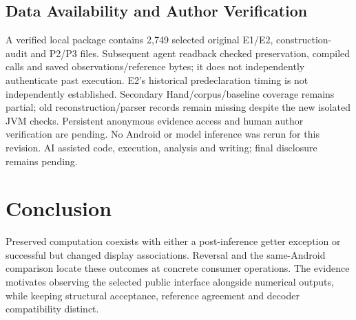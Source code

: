 \documentclass[10pt,conference]{IEEEtran}
\begin{document}
\subsection{Data Availability and Author Verification}
A verified local package contains 2,749 selected original E1/E2, construction-audit and P2/P3 files. Subsequent agent readback checked preservation, compiled calls and saved observations/reference bytes; it does not independently authenticate past execution. E2's historical predeclaration timing is not independently established. Secondary Hand/corpus/baseline coverage remains partial; old reconstruction/parser records remain missing despite the new isolated JVM checks. Persistent anonymous evidence access and human author verification are pending. No Android or model inference was rerun for this revision. AI assisted code, execution, analysis and writing; final disclosure remains pending.

\section{Conclusion}
Preserved computation coexists with either a post-inference getter exception or successful but changed display associations. Reversal and the same-Android comparison locate these outcomes at concrete consumer operations. The evidence motivates observing the selected public interface alongside numerical outputs, while keeping structural acceptance, reference agreement and decoder compatibility distinct.
\end{document}
